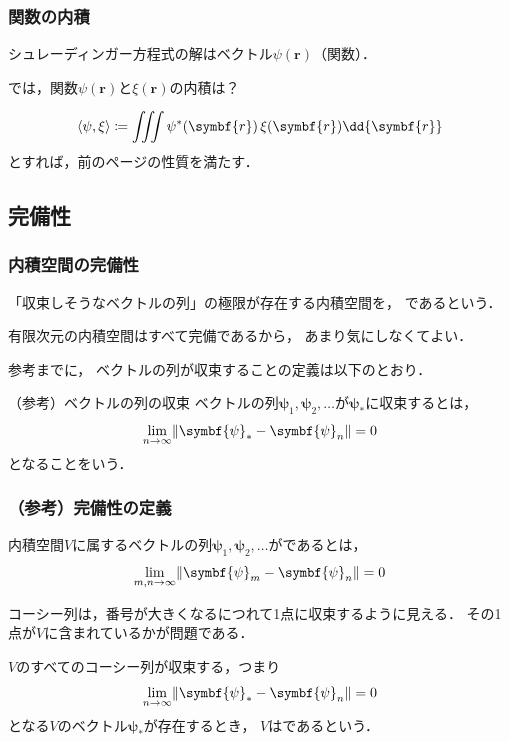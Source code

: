 \documentclass[
    10pt,
    ]{sotsu-beamer}
\begin{document}
\begin{frame}
    \frametitle{関数の内積}

    シュレーディンガー方程式の解はベクトル$\psi(\symbf{r})$（関数）．

    では，関数$\psi(\symbf{r})$と$\xi(\symbf{r})$の内積は？

    \pause

    \begin{equation}
        \iparen{\psi, \xi}
            \coloneq \iiint \conj{\psi}(\symbf{r}) \, \xi(\symbf{r}) \dd{\symbf{r}}
    \end{equation}
    とすれば，前のページの性質を満たす．

\end{frame}


\subsection{完備性}


\begin{frame}
    \frametitle{内積空間の完備性}

    「収束しそうなベクトルの列」の極限が存在する内積空間を，
    であるという．

    \alert{有限次元の内積空間はすべて完備である}から，
    あまり気にしなくてよい．

    参考までに，
    ベクトルの列が収束することの定義は以下のとおり．
    \begin{block}{（参考）ベクトルの列の収束}
        ベクトルの列$\symbf{\psi}_1, \symbf{\psi}_2, \dotsc$が$\symbf{\psi}_*$に収束するとは，
        \begin{equation*}
            \lim_{n \to \infty} \norm{ \symbf{\psi}_* - \symbf{\psi}_n } = 0
        \end{equation*}
        となることをいう．
    \end{block}

\end{frame}


\begin{frame}
    \frametitle{（参考）完備性の定義}

    内積空間$V$に属するベクトルの列$\symbf{\psi}_1, \symbf{\psi}_2, \dotsc$がであるとは，
    \begin{equation*}
        \lim_{m, n \to \infty} \norm{\symbf{\psi}_m - \symbf{\psi}_n} = 0
    \end{equation*}

    コーシー列は，番号が大きくなるにつれて1点に収束するように見える．
    その1点が$V$に含まれているかが問題である．

    $V$のすべてのコーシー列が収束する，つまり
    \begin{equation*}
        \lim_{n \to \infty} \norm{ \symbf{\psi}_* - \symbf{\psi}_n } = 0
    \end{equation*}
    となる$V$のベクトル$\symbf{\psi}_*$が存在するとき，
    $V$はであるという．

\end{frame}
\end{document}
